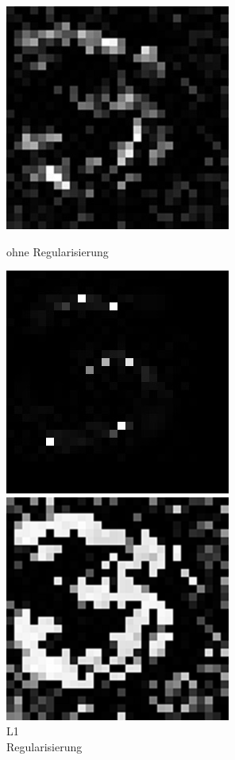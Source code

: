 \begin{figure}[ht]
\centering
	\begin{minipage}[b]{.25\linewidth}
  		\includegraphics[scale=0.7]{bilder/l0_3}
  		\caption{ohne Regularisierung}
  	\end{minipage}
  	\hspace{.05\linewidth}%
  	\begin{minipage}[b]{.25\linewidth}
  		\includegraphics[scale=0.7]{bilder/l1_3}
		\caption{L1 \\Regularisierung}
	\end{minipage}
	\hspace{.05\linewidth}%
	\begin{minipage}[b]{.25\linewidth}
  		\includegraphics[scale=0.7]{bilder/l2_3}

\end{minipage}
\end{figure}
